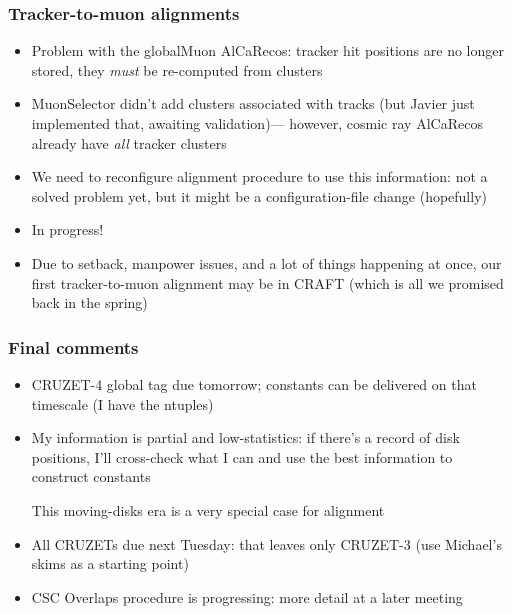 \documentclass[compress]{beamer}
\begin{document}
\begin{frame}
\frametitle{Tracker-to-muon alignments}
\small

\begin{itemize}\setlength{\itemsep}{0.3 cm}
\item Problem with the globalMuon AlCaRecos: tracker hit positions are
  no longer stored, they {\it must} be re-computed from clusters

\item MuonSelector didn't add clusters associated with tracks (but
  Javier just implemented that, awaiting validation)--- however,
  cosmic ray AlCaRecos already have {\it all} tracker clusters

\item We need to reconfigure alignment procedure to use this
  information: not a solved problem yet, but it might be a
  configuration-file change (hopefully)

\item In progress!

\item Due to setback, manpower issues, and a lot of things happening
  at once, our first tracker-to-muon alignment may be in CRAFT (which
  is all we promised back in the spring)

\end{itemize}
\end{frame}

\begin{frame}
\frametitle{Final comments}
\small
\begin{itemize}\setlength{\itemsep}{0.3 cm}

\item CRUZET-4 global tag due tomorrow; constants can be delivered on
  that timescale (I have the ntuples)

\item My information is partial and low-statistics: if there's a
  record of disk positions, I'll cross-check what I can and use the
  best information to construct constants

This moving-disks era is a very special case for alignment

\item All CRUZETs due next Tuesday: that leaves only CRUZET-3 (use
  Michael's skims as a starting point)

\end{itemize}

\vfill
\begin{itemize}
\item CSC Overlaps procedure is progressing: more detail at a later meeting
\end{itemize}

\label{numpages}
\end{frame}

\end{document}
